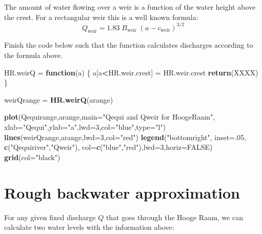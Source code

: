 \documentclass[
]{article}
\newenvironment{Shaded}{\begin{snugshade}}{\end{snugshade}}
\newcommand{\AttributeTok}[1]{\textcolor[rgb]{0.13,0.29,0.53}{#1}}
\newcommand{\ConstantTok}[1]{\textcolor[rgb]{0.56,0.35,0.01}{#1}}
\newcommand{\ControlFlowTok}[1]{\textcolor[rgb]{0.13,0.29,0.53}{\textbf{#1}}}
\newcommand{\DecValTok}[1]{\textcolor[rgb]{0.00,0.00,0.81}{#1}}
\newcommand{\FunctionTok}[1]{\textcolor[rgb]{0.13,0.29,0.53}{\textbf{#1}}}
\newcommand{\NormalTok}[1]{#1}
\newcommand{\OtherTok}[1]{\textcolor[rgb]{0.56,0.35,0.01}{#1}}
\newcommand{\SpecialCharTok}[1]{\textcolor[rgb]{0.81,0.36,0.00}{\textbf{#1}}}
\newcommand{\StringTok}[1]{\textcolor[rgb]{0.31,0.60,0.02}{#1}}
\begin{document}
The amount of water flowing over a weir is a function of the water
height above the crest. For a rectangular weir this is a well known
formula:
\[Q_\mathrm{weir} = 1.83\; B_\mathrm{weir}\; (a-c_\mathrm{weir})^{3/2}\]

Finish the code below such that the function calculates discharges
according to the formula above.

\begin{Shaded}
\begin{Highlighting}[]
\NormalTok{HR.weirQ }\OtherTok{=} \ControlFlowTok{function}\NormalTok{(a)}
\NormalTok{\{}
\NormalTok{  a[a}\SpecialCharTok{\textless{}}\NormalTok{HR.weir.crest] }\OtherTok{=}\NormalTok{ HR.weir.crest}
  \FunctionTok{return}\NormalTok{(XXXX)}
\NormalTok{\}}

\NormalTok{weirQrange }\OtherTok{=} \FunctionTok{HR.weirQ}\NormalTok{(arange)}

\FunctionTok{plot}\NormalTok{(Qequirange,arange,}\AttributeTok{main=}\StringTok{"Qequi and Qweir for HoogeRaam"}\NormalTok{,}
     \AttributeTok{xlab=}\StringTok{"Qequi"}\NormalTok{,}\AttributeTok{ylab=}\StringTok{"a"}\NormalTok{,}\AttributeTok{lwd=}\DecValTok{3}\NormalTok{,}\AttributeTok{col=}\StringTok{"blue"}\NormalTok{,}\AttributeTok{type=}\StringTok{"l"}\NormalTok{)}
\FunctionTok{lines}\NormalTok{(weirQrange,arange,}\AttributeTok{lwd=}\DecValTok{3}\NormalTok{,}\AttributeTok{col=}\StringTok{"red"}\NormalTok{)}
\FunctionTok{legend}\NormalTok{(}\StringTok{"bottomright"}\NormalTok{, }\AttributeTok{inset=}\NormalTok{.}\DecValTok{05}\NormalTok{,}
       \FunctionTok{c}\NormalTok{(}\StringTok{"Qequiriver"}\NormalTok{,}\StringTok{"Qweir"}\NormalTok{), }\AttributeTok{col=}\FunctionTok{c}\NormalTok{(}\StringTok{"blue"}\NormalTok{,}\StringTok{"red"}\NormalTok{),}\AttributeTok{lwd=}\DecValTok{3}\NormalTok{,}\AttributeTok{horiz=}\ConstantTok{FALSE}\NormalTok{)}
\FunctionTok{grid}\NormalTok{(}\AttributeTok{col=}\StringTok{"black"}\NormalTok{)}
\end{Highlighting}
\end{Shaded}

\hypertarget{rough-backwater-approximation}{%
\section{Rough backwater
approximation}\label{rough-backwater-approximation}}

For any given fixed discharge \(Q\) that goes through the Hooge Raam, we
can calculate two water levels with the information above:
\end{document}
